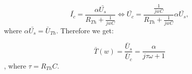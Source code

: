 \begin{equation}
    \bar{I_c} = \frac{\alpha \bar{U_s}}{R_{Th}+ \frac{1}{jwC}} \iff \bar{U_c} = \frac{\frac{1}{jwC}}{R_{Th} +  \frac{1}{jwC}} \alpha \bar{U_s}, 
\end{equation}
where $\alpha \bar{U_s} = \bar{U}_{Th}$.
Therefore we get:

\begin{equation}\label{eq: freqResp}
\bar{T}(w) = \frac{\bar{U}_s}{\bar{U}_c} = \frac{\alpha}{j \tau \omega + 1} \end{equation}
, where $\tau = R_{Th}C$.
